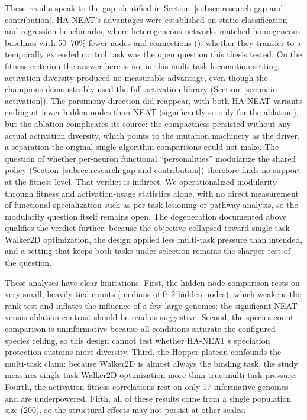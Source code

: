 \documentclass[12pt]{article}
\begin{document}
These results speak to the gap identified in Section~\ref{subsec:research-gap-and-contribution}.
HA-NEAT's advantages were established on static classification and regression benchmarks, where heterogeneous networks matched homogeneous baselines with 50--70\% fewer nodes and connections (\cite{hagg_evolving_2017}); whether they transfer to a temporally extended control task was the open question this thesis tested.
On the fitness criterion the answer here is no: in this multi-task locomotion setting, activation diversity produced no measurable advantage, even though the champions demonstrably used the full activation library (Section~\ref{sec:main-activation}).
The parsimony direction did reappear, with both HA-NEAT variants ending at fewer hidden nodes than NEAT (significantly so only for the ablation), but the ablation complicates its source: the compactness persisted without any actual activation diversity, which points to the mutation machinery as the driver, a separation the original single-algorithm comparisons could not make.
The question of whether per-neuron functional ``personalities'' modularize the shared policy (Section~\ref{subsec:research-gap-and-contribution}) therefore finds no support at the fitness level.
That verdict is indirect. We operationalized modularity through fitness and activation-usage statistics alone, with no direct measurement of functional specialization such as per-task lesioning or pathway analysis, so the modularity question itself remains open.
The degeneration documented above qualifies the verdict further: because the objective collapsed toward single-task Walker2D optimization, the design applied less multi-task pressure than intended, and a setting that keeps both tasks under selection remains the sharper test of the question.

These analyses have clear limitations.
First, the hidden-node comparison rests on very small, heavily tied counts (medians of 0--2 hidden nodes), which weakens the rank test and inflates the influence of a few large genomes; the significant NEAT-versus-ablation contrast should be read as suggestive.
Second, the species-count comparison is uninformative because all conditions saturate the configured species ceiling, so this design cannot test whether HA-NEAT's speciation protection sustains more diversity.
Third, the Hopper plateau confounds the multi-task claim: because Walker2D is almost always the binding task, the study measures single-task Walker2D optimization more than true multi-task pressure.
Fourth, the activation-fitness correlations rest on only 17 informative genomes and are underpowered.
Fifth, all of these results come from a single population size (200), so the structural effects may not persist at other scales.
\end{document}
